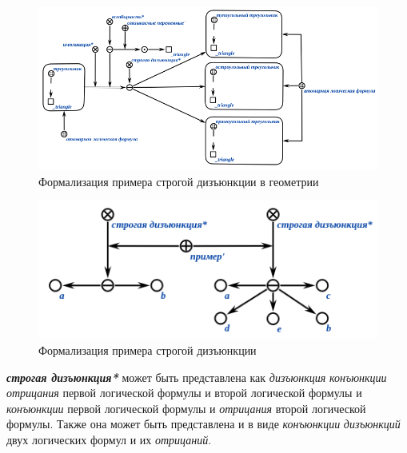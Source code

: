 \begin{figure}[http]
	\includegraphics[scale=0.8]{author/part2/figures/logic/strict_disjunction_triangle.png}
	\caption{Формализация примера строгой дизъюнкции в геометрии}
	\label{fig:strict_disjunction_triangle}
\end{figure}

\begin{figure}[http]
	\includegraphics[scale=0.8]{author/part2/figures/logic/strictDisjunction.png}
	\caption{Формализация примера строгой дизъюнкции}
	\label{fig:strict_disjunction}
\end{figure}

\textbf{\textit{строгая дизъюнкция*}} может быть представлена как \textit{дизъюнкция} \textit{конъюнкции} \textit{отрицания} первой логической формулы и второй логической формулы и \textit{конъюнкции} первой логической формулы и \textit{отрицания} второй логической формулы. Также она может быть представлена и в виде \textit{конъюнкции} \textit{дизъюнкций} двух логических формул и их \textit{отрицаний}.


